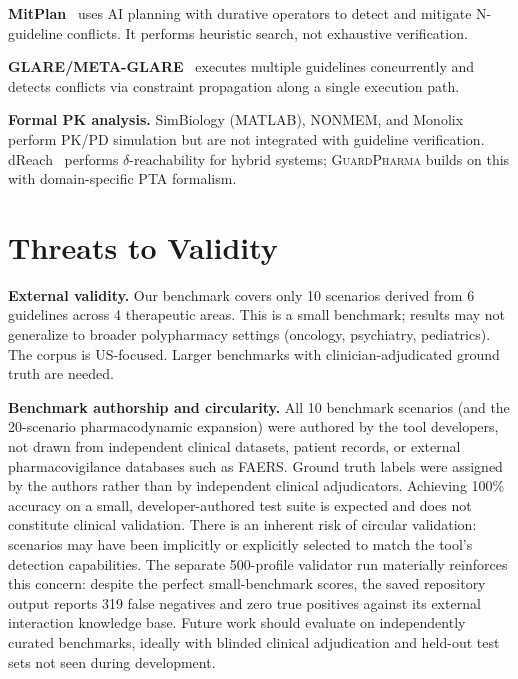 \documentclass{article}
\theoremstyle{definition}
\begin{document}
\textbf{MitPlan}~\cite{wilk2021mitplan} uses AI planning with durative operators to detect and mitigate N-guideline conflicts. It performs heuristic search, not exhaustive verification.

\textbf{GLARE/META-GLARE}~\cite{terenziani2023} executes multiple guidelines concurrently and detects conflicts via constraint propagation along a single execution path.

\textbf{Formal PK analysis.} SimBiology (MATLAB), NONMEM, and Monolix perform PK/PD simulation but are not integrated with guideline verification. dReach~\cite{gao2013delta} performs $\delta$-reachability for hybrid systems; \textsc{GuardPharma} builds on this with domain-specific PTA formalism.

\section{Threats to Validity}
\label{sec:threats}


\textbf{External validity.} Our benchmark covers only 10 scenarios derived from 6 guidelines across 4 therapeutic areas. This is a small benchmark; results may not generalize to broader polypharmacy settings (oncology, psychiatry, pediatrics). The corpus is US-focused. Larger benchmarks with clinician-adjudicated ground truth are needed.

\textbf{Benchmark authorship and circularity.} All 10 benchmark scenarios (and the 20-scenario pharmacodynamic expansion) were authored by the tool developers, not drawn from independent clinical datasets, patient records, or external pharmacovigilance databases such as FAERS. Ground truth labels were assigned by the authors rather than by independent clinical adjudicators. Achieving 100\% accuracy on a small, developer-authored test suite is expected and does not constitute clinical validation. There is an inherent risk of circular validation: scenarios may have been implicitly or explicitly selected to match the tool's detection capabilities. The separate 500-profile validator run materially reinforces this concern: despite the perfect small-benchmark scores, the saved repository output reports 319 false negatives and zero true positives against its external interaction knowledge base. Future work should evaluate on independently curated benchmarks, ideally with blinded clinical adjudication and held-out test sets not seen during development.
\end{document}
